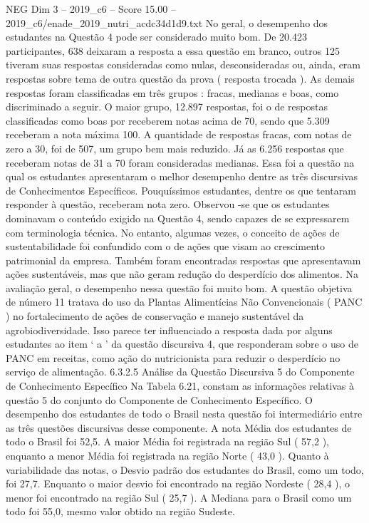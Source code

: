 \begin{textsample}{NEG Dim 3 – 2019\_c6 – Score 15.00 – 2019\_c6/enade\_2019\_nutri\_acdc34d1d9.txt}
No geral, o desempenho dos estudantes na Questão 4 pode ser considerado muito bom.
De 20.423 participantes, 638 deixaram a resposta a essa questão em branco, outros 125 tiveram suas respostas consideradas como nulas, desconsideradas ou, ainda, eram respostas sobre tema de outra questão da prova ( resposta trocada ).
As demais respostas foram classificadas em três grupos : fracas, medianas e boas, como discriminado a seguir.
O maior grupo, 12.897 respostas, foi o de respostas classificadas como boas por receberem notas acima de 70, sendo que 5.309 receberam a nota máxima 100.
A quantidade de respostas fracas, com notas de zero a 30, foi de 507, um grupo bem mais reduzido.
Já as 6.256 respostas que receberam notas de 31 a 70 foram consideradas medianas.
Essa foi a questão na qual os estudantes apresentaram o melhor desempenho dentre as três discursivas de Conhecimentos Específicos.
Pouquíssimos estudantes, dentre os que tentaram responder à questão, receberam nota zero.
Observou -se que os estudantes dominavam o conteúdo exigido na Questão 4, sendo capazes de se expressarem com terminologia técnica.
No entanto, algumas vezes, o conceito de ações de sustentabilidade foi confundido com o de ações que visam ao crescimento patrimonial da empresa.
Também foram encontradas respostas que apresentavam ações sustentáveis, mas que não geram redução do desperdício dos alimentos.
Na avaliação geral, o desempenho nessa questão foi muito bom.
A questão objetiva de número 11 tratava do uso da Plantas Alimentícias Não Convencionais ( PANC ) no fortalecimento de ações de conservação e manejo sustentável da agrobiodiversidade.
Isso parece ter influenciado a resposta dada por alguns estudantes ao item ‘ a ’ da questão discursiva 4, que responderam sobre o uso de PANC em receitas, como ação do nutricionista para reduzir o desperdício no serviço de alimentação. 6.3.2.5 Análise da Questão Discursiva 5 do Componente de Conhecimento Específico Na Tabela 6.21, constam as informações relativas à questão 5 do conjunto do Componente de Conhecimento Específico.
O desempenho dos estudantes de todo o Brasil nesta questão foi intermediário entre as três questões discursivas desse componente.
A nota Média dos estudantes de todo o Brasil foi 52,5.
A maior Média foi registrada na região Sul ( 57,2 ), enquanto a menor Média foi registrada na região Norte ( 43,0 ).
Quanto à variabilidade das notas, o Desvio padrão dos estudantes do Brasil, como um todo, foi 27,7.
Enquanto o maior desvio foi encontrado na região Nordeste ( 28,4 ), o menor foi encontrado na região Sul ( 25,7 ).
A Mediana para o Brasil como um todo foi 55,0, mesmo valor obtido na região Sudeste.

\end{textsample}
